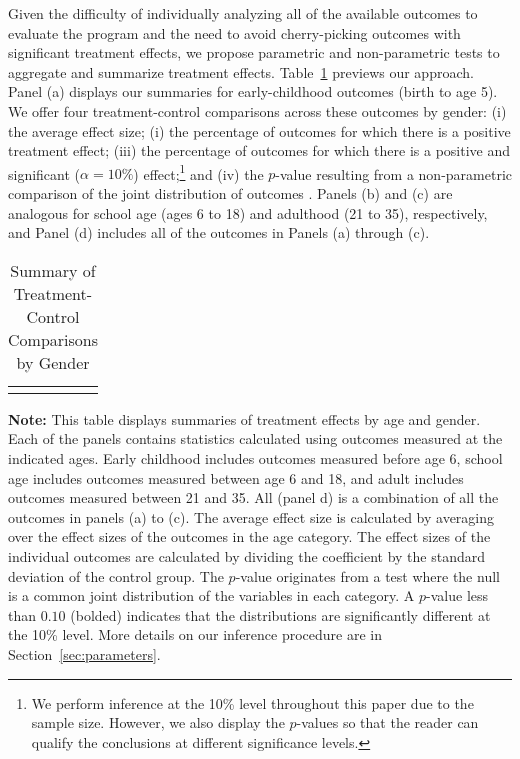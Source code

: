 Given the difficulty of individually analyzing all of the available outcomes to evaluate the program and the need to avoid cherry-picking outcomes with significant treatment effects, we propose parametric and non-parametric tests to aggregate and summarize treatment effects. Table~\ref{table:summary} previews our approach. Panel (a) displays our summaries for early-childhood outcomes (birth to age 5). We offer four treatment-control comparisons across these outcomes by gender: (i) the average effect size; (i) the percentage of outcomes for which there is a positive treatment effect; (iii) the percentage of outcomes for which there is a positive and significant ($\alpha=10\%$) effect;\footnote{We perform inference at the 10\% level throughout this paper due to the sample size. However, we also display the $p$-values so that the reader can qualify the conclusions at different significance levels.} and (iv) the $p$-value resulting from a non-parametric comparison of the joint distribution of outcomes \citep{Rosenbaum_2005_Distribution_JRSS}. Panels (b) and (c) are analogous for school age (ages 6 to 18) and adulthood (21 to 35), respectively, and Panel (d) includes all of the outcomes in Panels (a) through (c).


\begin{table}[!htpb]
\begin{threeparttable}
\caption{Summary of Treatment-Control Comparisons by Gender} \label{table:summary}
\centering 
\begin{tabularx}{16.5cm}{XcX}
&  & 
\end{tabularx}
\begin{tablenotes}
\footnotesize
\item \textbf{Note:} This table displays summaries of treatment effects by age and gender. Each of the panels contains statistics calculated using outcomes measured at the indicated ages. Early childhood includes outcomes measured before age 6, school age includes outcomes measured between age 6 and 18, and adult includes outcomes measured between 21 and 35. All (panel d) is a combination of all the outcomes in panels (a) to (c). The average effect size is calculated by averaging over the effect sizes of the outcomes in the age category. The effect sizes of the individual outcomes are calculated by dividing the coefficient by the standard deviation of the control group. The \citet{Rosenbaum_2005_Distribution_JRSS} $p$-value originates from a test where the null is a common joint distribution of the variables in each category. A $p$-value less than $0.10$ (bolded) indicates that the distributions are significantly different at the 10\% level. More details on our inference procedure are in Section~\ref{sec:parameters}.
\end{tablenotes}
\end{threeparttable}
\end{table}

